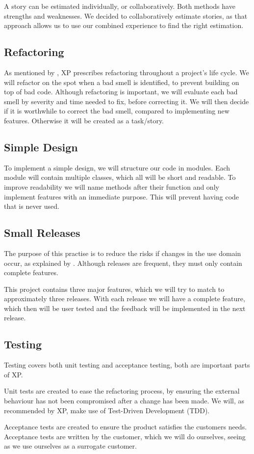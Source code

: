 A story can be estimated individually, or collaboratively. Both methods have strengths and weaknesses.
We decided to collaboratively estimate stories, as that approach allows us to use our combined experience to find the right estimation.

\subsection{Refactoring}
As mentioned by \citet[Refactor Mercilessly]{xp:online}, XP prescribes refactoring throughout a project's life cycle. We will refactor on the spot when a bad smell is identified, to prevent building on top of bad code.
Although refactoring is important, we will evaluate each bad smell by severity and time needed to fix, before correcting it.
We will then decide if it is worthwhile to correct the bad smell, compared to implementing new features. Otherwise it will be created as a task/story.

\subsection{Simple Design}
To implement a simple design, we will structure our code in modules.
Each module will contain multiple classes, which all will be short and readable.
To improve readability we will name methods after their function and only implement features with an immediate purpose. This will prevent having code that is never used.

\subsection{Small Releases}
The purpose of this practise is to reduce the risks if changes in the use domain occur, as explained by \citet[p. 61]{xp:explored}.
Although releases are frequent, they must only contain complete features.

This project contains three major features, which we will try to match to approximately three releases.
With each release we will have a complete feature, which then will be user tested and the feedback will be implemented in the next release.

\subsection{Testing}
Testing covers both unit testing and acceptance testing, both are important parts of XP.

Unit tests are created to ease the refactoring process, by ensuring the external behaviour has not been compromised after a change has been made.
We will, as recommended by XP, make use of Test-Driven Development (TDD).

Acceptance tests are created to ensure the product satisfies the customers needs.
Acceptance tests are written by the customer, which we will do ourselves, seeing as we use ourselves as a surrogate customer.